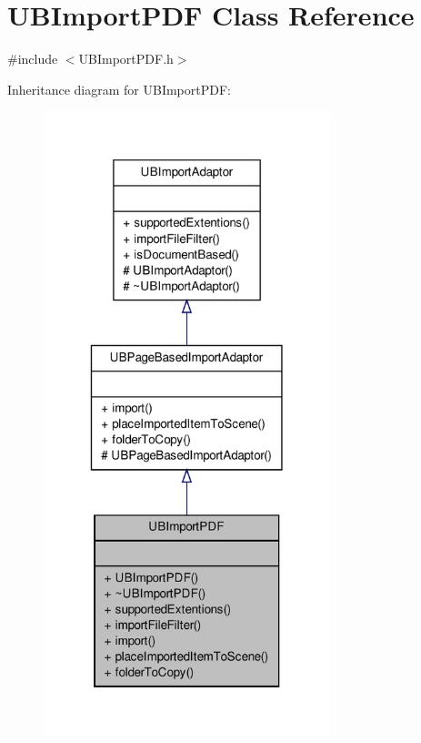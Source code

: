 \hypertarget{class_u_b_import_p_d_f}{\section{U\-B\-Import\-P\-D\-F Class Reference}
\label{d4/d2f/class_u_b_import_p_d_f}
}


{\ttfamily \#include $<$U\-B\-Import\-P\-D\-F.\-h$>$}



Inheritance diagram for U\-B\-Import\-P\-D\-F\-:
\nopagebreak
\begin{figure}[H]
\begin{center}
\leavevmode
\includegraphics[width=236pt]{d3/db3/class_u_b_import_p_d_f__inherit__graph}
\end{center}
\end{figure}


